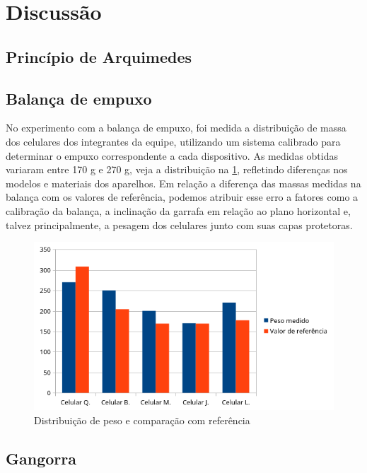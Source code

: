 \section{Discussão}
\subsection{Princípio de Arquimedes}

\subsection{Balança de empuxo}
No experimento com a balança de empuxo, foi medida a distribuição de massa dos
celulares dos integrantes da equipe, utilizando um sistema calibrado para
determinar o empuxo correspondente a cada dispositivo. As medidas obtidas
variaram entre 170 g e 270 g, veja a distribuição na \cref{pesos}, refletindo
diferenças nos modelos e materiais dos
aparelhos. Em relação a diferença das massas medidas na balança com os valores
de referência, podemos atribuir esse erro a fatores como a calibração da
balança, a inclinação da garrafa em relação ao plano horizontal e, talvez
principalmente, a pesagem dos celulares junto com suas capas protetoras.
\begin{figure}[H]
    \centering
    \includegraphics[width=.5\linewidth]{fig/pesos.png}
    \caption{Distribuição de peso e comparação com referência}
    \label{pesos}
\end{figure}
\subsection{Gangorra}

